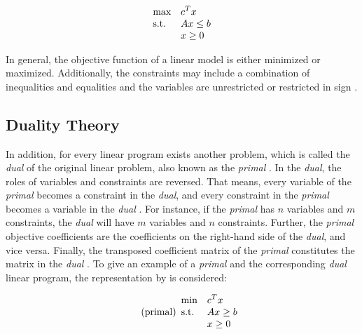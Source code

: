 \begin{equation*}
    \begin{array}{ll@{}ll}
        \text{max}  & \displaystyle c^{T}x &\\
        \text{s.t.}& \displaystyle Ax \leq b&\\
                    &                        x \geq 0
    \end{array}
\end{equation*}

\clearpage
In general, the objective function of a linear model is either minimized or maximized.
Additionally, the constraints may include a combination of inequalities and equalities
and the variables are unrestricted or restricted in sign .

\subsection{Duality Theory}
\label{sec:duality_theory}
In addition, for every linear program exists another problem, which
is called the \textit{dual} of the original linear problem, also known as the 
\textit{primal} .
In the \textit{dual}, the roles of variables and constraints are reversed. 
That means, every variable of the \textit{primal} becomes a constraint in the \textit{dual},
and every constraint in the \textit{primal} becomes a variable in 
the \textit{dual} .
For instance, if the \textit{primal} has $n$ variables and $m$ constraints, the \textit{dual}
will have $m$ variables and $n$ constraints. Further, the \textit{primal} objective coefficients 
are the coefficients on the right-hand side of 
the \textit{dual}, and vice versa.
Finally, the transposed coefficient matrix of the \textit{primal} constitutes the matrix in the 
\textit{dual} .
To give an example of a \textit{primal} and the corresponding \textit{dual} linear program,
the representation by  is considered:

\begin{equation}
    \tag{primal}
    \begin{array}{ll@{}ll}
        \text{min}  & \displaystyle c^{T}x &\\
        \text{s.t.}& \displaystyle Ax \geq b  &\\
                    &                        x \geq 0
    \end{array}
\end{equation}

